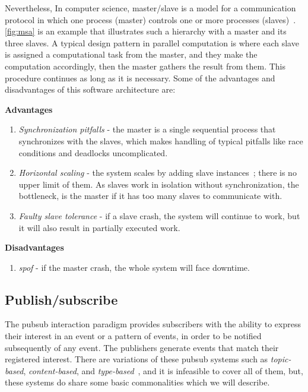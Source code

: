 Nevertheless, In computer science, master/slave is a model for a communication protocol in which one process (master) controls one or more processes (slaves)~\cite{ms_bs}. \autoref{fig:msa} is an example that illustrates such a hierarchy with a master and its three slaves. A typical design pattern in parallel computation is where each slave is assigned a computational task from the master, and they make the computation accordingly, then the master gathers the result from them. This procedure continues as long as it is necessary. Some of the advantages and disadvantages of this software architecture are:

\textbf{Advantages}
\begin{enumerate}
    \item \emph{Synchronization pitfalls} - the master is a single sequential process that synchronizes with the slaves, which makes handling of typical pitfalls like race conditions and deadlocks uncomplicated.

    \item \emph{Horizontal scaling} - the system scales by adding slave instances~\cite{ms_hor}; there is no upper limit of them. As slaves work in isolation without synchronization, the bottleneck, is the master if it has too many slaves to communicate with.
    
    \item \emph{Faulty slave tolerance} - if a slave crash, the system will continue to work, but it will also result in partially executed work. 
\end{enumerate}

\textbf{Disadvantages}
\begin{enumerate}
    \item \emph{\Ac{spof}} - if the master crash, the whole system will face downtime.
\end{enumerate}


\subsection{Publish/subscribe}
The \ac{pubsub} interaction paradigm provides subscribers with the ability to express their interest in an event or a pattern of events, in order to be notified subsequently of any event. The publishers generate events that match their registered interest. There are variations of these \ac{pubsub} systems such as \emph{topic-based}, \emph{content-based}, and \emph{type-based}~\cite{eugster2003many}, and it is infeasible to cover all of them, but, these systems do share some basic commonalities which we will describe.


